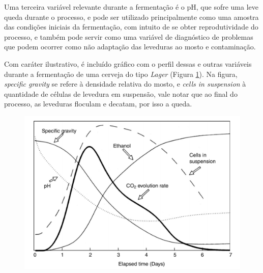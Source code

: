 Uma terceira variável relevante durante a fermentação é o pH, que sofre uma leve queda durante o processo, e pode ser 
utilizado principalmente como uma amostra das condições iniciais da fermentação, com intuito de se obter reprodutividade do 
processo, e também pode servir como uma variável de diagnóstico de problemas que podem ocorrer como não adaptação das 
leveduras ao mosto e contaminação.

Com caráter ilustrativo, é incluído gráfico com o perfil dessas e outras variáveis durante a fermentação de uma cerveja 
do tipo \textit{Lager} (Figura \ref{fig:variaveis_fermentacao}). Na figura, \textit{specific gravity} se refere à
densidade relativa do mosto, e \textit{cells in suspension} à quantidade de células de levedura em suspensão, vale notar que 
ao final do processo, as leveduras floculam e decatam, por isso a queda.

\begin{figure}[H]
    \centering
    \includegraphics[scale=0.40]{figuras/contexto/variaveis_fermentacao.PNG}
    \label{fig:variaveis_fermentacao}
\end{figure}



